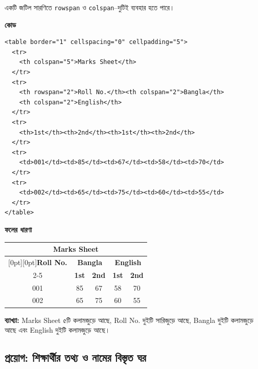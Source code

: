 একটি জটিল সারণিতে \texttt{rowspan} ও \texttt{colspan}--দুটিই ব্যবহার হতে পারে।

\par\noindent
\begin{minipage}[t]{.54\linewidth}\vspace{0pt}\small
\textbf{\color{chFourTeal}কোড}\par
\begin{verbatim}
<table border="1" cellspacing="0" cellpadding="5">
  <tr>
    <th colspan="5">Marks Sheet</th>
  </tr>
  <tr>
    <th rowspan="2">Roll No.</th><th colspan="2">Bangla</th>
    <th colspan="2">English</th>
  </tr>
  <tr>
    <th>1st</th><th>2nd</th><th>1st</th><th>2nd</th>
  </tr>
  <tr>
    <td>001</td><td>85</td><td>67</td><td>58</td><td>70</td>
  </tr>
  <tr>
    <td>002</td><td>65</td><td>75</td><td>60</td><td>55</td>
  </tr>
</table>
\end{verbatim}
\par\smallskip
\end{minipage}\hfill
\begin{minipage}[t]{.42\linewidth}\vspace{0pt}\small
\textbf{\color{chFourTeal}ফলের ধারণা}\par
\begin{center}
\begin{tabular}{|c|c|c|c|c|}
\hline
\multicolumn{5}{|c|}{\textbf{Marks Sheet}} \\
\hline
\raisebox{-.5\normalbaselineskip}[0pt][0pt]{\textbf{Roll No.}} & \multicolumn{2}{c|}{\textbf{Bangla}} & \multicolumn{2}{c|}{\textbf{English}} \\
\cline{2-5}
 & \textbf{1st} & \textbf{2nd} & \textbf{1st} & \textbf{2nd} \\
\hline
001 & 85 & 67 & 58 & 70 \\
\hline
002 & 65 & 75 & 60 & 55 \\
\hline
\end{tabular}
\end{center}
\textbf{ব্যাখ্যা:} Marks Sheet ৫টি কলামজুড়ে আছে, Roll No. দুইটি সারিজুড়ে আছে, Bangla দুইটি কলামজুড়ে আছে এবং English দুইটি কলামজুড়ে আছে।
\par\smallskip
\end{minipage}\par


\subsection{প্রয়োগ: শিক্ষার্থীর তথ্য ও নামের বিস্তৃত ঘর}

